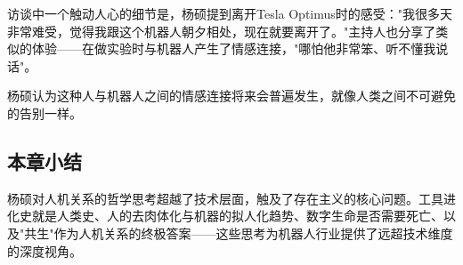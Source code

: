 访谈中一个触动人心的细节是，杨硕提到离开Tesla Optimus时的感受："我很多天非常难受，觉得我跟这个机器人朝夕相处，现在就要离开了。"主持人也分享了类似的体验——在做实验时与机器人产生了情感连接，"哪怕他非常笨、听不懂我说话"。

杨硕认为这种人与机器人之间的情感连接将来会普遍发生，就像人类之间不可避免的告别一样。

\subsection{本章小结}

杨硕对人机关系的哲学思考超越了技术层面，触及了存在主义的核心问题。工具进化史就是人类史、人的去肉体化与机器的拟人化趋势、数字生命是否需要死亡、以及"共生"作为人机关系的终极答案——这些思考为机器人行业提供了远超技术维度的深度视角。


